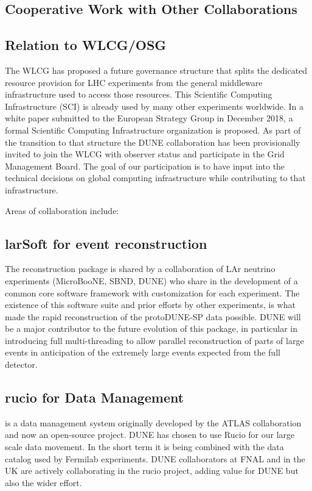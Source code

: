 \subsection{Cooperative Work with Other Collaborations	}
\label{ch:exec-comp-gov-coop}

\subsection{Relation to WLCG/OSG}
The WLCG has proposed a future governance structure that splits the dedicated resource provision for LHC experiments from the general middleware infrastructure used to access those resources.  This Scientific Computing Infrastructure (SCI) is already used by many other experiments worldwide.  In a white paper submitted to the European Strategy Group in December 2018, a formal Scientific Computing Infrastructure organization is proposed. As part of the transition to that structure the DUNE collaboration has been provisionally invited to join the WLCG with observer status and participate in the Grid Management Board. The goal of our participation is to have input into the technical decisions on global computing infrastructure while contributing to that infrastructure. 

Areas of collaboration include:

\subsection{larSoft for event reconstruction}

The   reconstruction package is shared by a collaboration of LAr neutrino experiments (MicroBooNE, SBND, DUNE) who share in the development of a common core software framework with customization for each experiment. The existence of this software suite and prior efforts by other experiments,  is what made the rapid reconstruction of the protoDUNE-SP data possible.  DUNE will be a major contributor to  the future evolution of this package, in particular in introducing full multi-threading to allow parallel reconstruction of parts of large events in anticipation of the extremely large events expected from the full detector.  

\subsection{rucio for Data Management}  
\cite{Barisits:2019fyl}
is a data management system originally developed by the ATLAS collaboration and now an open-source project.  DUNE has chosen to use Rucio for our large scale data movement.  In the short term it is being combined with the  data catalog used by Fermilab experiments.  DUNE collaborators at FNAL and in the UK are actively collaborating in the rucio project, adding value for DUNE but also the wider effort.




